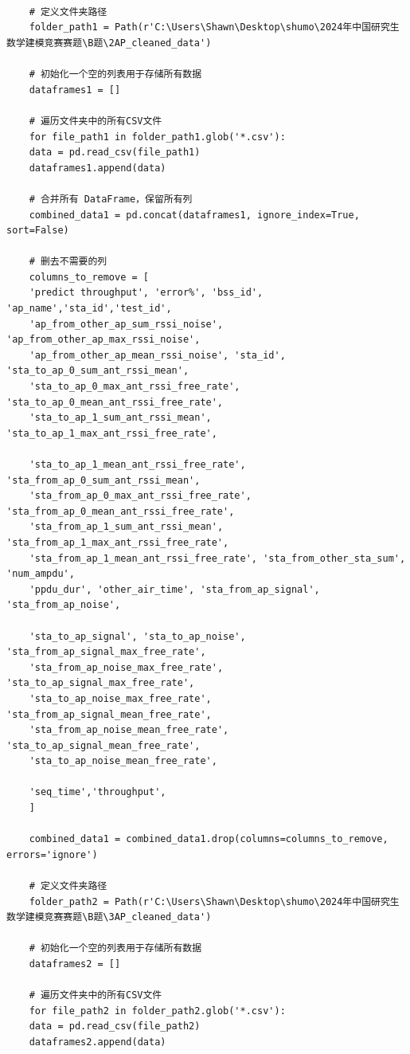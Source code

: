 \documentclass[bwprint]{gmcmthesis}
\begin{document}
\begin{lstlisting}

	
	
	# 定义文件夹路径
	folder_path1 = Path(r'C:\Users\Shawn\Desktop\shumo\2024年中国研究生数学建模竞赛赛题\B题\2AP_cleaned_data')
	
	# 初始化一个空的列表用于存储所有数据
	dataframes1 = []
	
	# 遍历文件夹中的所有CSV文件
	for file_path1 in folder_path1.glob('*.csv'):
	data = pd.read_csv(file_path1)
	dataframes1.append(data)
	
	# 合并所有 DataFrame，保留所有列
	combined_data1 = pd.concat(dataframes1, ignore_index=True, sort=False)
	
	# 删去不需要的列
	columns_to_remove = [
	'predict throughput', 'error%', 'bss_id', 'ap_name','sta_id','test_id',
	'ap_from_other_ap_sum_rssi_noise', 'ap_from_other_ap_max_rssi_noise',
	'ap_from_other_ap_mean_rssi_noise', 'sta_id', 'sta_to_ap_0_sum_ant_rssi_mean',
	'sta_to_ap_0_max_ant_rssi_free_rate', 'sta_to_ap_0_mean_ant_rssi_free_rate',
	'sta_to_ap_1_sum_ant_rssi_mean', 'sta_to_ap_1_max_ant_rssi_free_rate',
	
	'sta_to_ap_1_mean_ant_rssi_free_rate', 'sta_from_ap_0_sum_ant_rssi_mean',
	'sta_from_ap_0_max_ant_rssi_free_rate', 'sta_from_ap_0_mean_ant_rssi_free_rate',
	'sta_from_ap_1_sum_ant_rssi_mean', 'sta_from_ap_1_max_ant_rssi_free_rate',
	'sta_from_ap_1_mean_ant_rssi_free_rate', 'sta_from_other_sta_sum', 'num_ampdu',
	'ppdu_dur', 'other_air_time', 'sta_from_ap_signal', 'sta_from_ap_noise',
	
	'sta_to_ap_signal', 'sta_to_ap_noise', 'sta_from_ap_signal_max_free_rate',
	'sta_from_ap_noise_max_free_rate', 'sta_to_ap_signal_max_free_rate',
	'sta_to_ap_noise_max_free_rate', 'sta_from_ap_signal_mean_free_rate',
	'sta_from_ap_noise_mean_free_rate', 'sta_to_ap_signal_mean_free_rate',
	'sta_to_ap_noise_mean_free_rate',
	
	'seq_time','throughput',
	]
	
	combined_data1 = combined_data1.drop(columns=columns_to_remove, errors='ignore')
	
	# 定义文件夹路径
	folder_path2 = Path(r'C:\Users\Shawn\Desktop\shumo\2024年中国研究生数学建模竞赛赛题\B题\3AP_cleaned_data')
	
	# 初始化一个空的列表用于存储所有数据
	dataframes2 = []
	
	# 遍历文件夹中的所有CSV文件
	for file_path2 in folder_path2.glob('*.csv'):
	data = pd.read_csv(file_path2)
	dataframes2.append(data)
	

\end{lstlisting}
\end{document}
